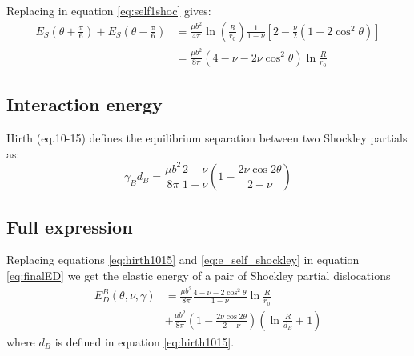 \documentclass[10pt,a4paper,final]{article}
\begin{document}
Replacing in equation \ref{eq:self1shoc} gives:
\begin{equation}
\begin{split}
E_S\left(\theta+\frac{\pi}{6}\right) + E_S\left(\theta-\frac{\pi}{6}\right) &=
\frac{\mu b^2}{4\pi}\ln\left(\frac{R}{r_0}\right)\frac{1}{1-\nu}\left[2-\frac{\nu}{2}(1+2\cos^2\theta)\right] \\
&=\frac{\mu b^2}{8\pi}(4-\nu-2\nu\cos^2\theta)\ln\frac{R}{r_0} \label{eq:e_self_shockley}
\end{split}
\end{equation}

\subsection{Interaction energy}
Hirth \cite{hirth1982theory}(eq.10-15) defines the equilibrium separation between two Shockley partials as:
\begin{equation}
\gamma_B d_B = \frac{\mu b^2}{8\pi}\frac{2-\nu}{1-\nu}\left(1-\frac{2\nu\cos2\theta}{2-\nu}\right)
\label{eq:hirth1015}
\end{equation}

\subsection{Full expression}
Replacing equations \ref{eq:hirth1015} and \ref{eq:e_self_shockley} in equation \ref{eq:finalED} we get the elastic energy of a pair of Shockley partial dislocations
\begin{equation}
\begin{split}
E_D^B(\theta,\nu,\gamma) &= \frac{\mu b^2}{8\pi}\frac{4-\nu-2\cos^2\theta}{1-\nu}\ln\frac{R}{r_0} \\ 
&+\frac{\mu b^2}{8\pi}\left(1-\frac{2\nu\cos2\theta}{2-\nu}\right)\left(\ln\frac{R}{d_B} + 1 \right)
\end{split}
\label{eq:EDshoc}
\end{equation}
where $d_B$ is defined in equation \ref{eq:hirth1015}.

\end{document}
